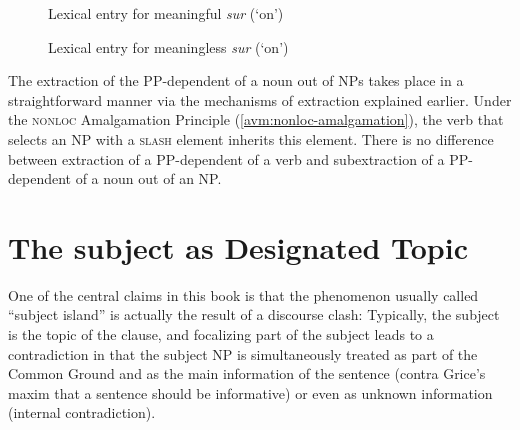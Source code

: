 \begin{figure}
\small\captionsetup{margin=.05\linewidth}%
\begin{floatrow}
\ffigbox
{}
{\caption{Lexical entry for meaningful \emph{sur} (`on')}\label{avm:sur-mf}}
\ffigbox
{}
{\caption{Lexical entry for meaningless \emph{sur} (`on')}\label{avm:sur-ml}}
\end{floatrow}
\end{figure}

The extraction of the PP-dependent of a noun out of NPs takes place in a straightforward manner via the mechanisms of extraction explained earlier. Under the \textsc{nonloc} Amalgamation Principle (\ref{avm:nonloc-amalgamation}), the verb that selects an NP with a \textsc{slash} element inherits this element. There is no difference between extraction of a PP-dependent of a verb and subextraction of a PP-dependent of a noun out of an NP.

\section{The subject as Designated Topic}

One of the central claims in this book is that the phenomenon usually called ``subject island'' is actually the result of a discourse clash: Typically, the subject is the topic of the clause, and focalizing part of the subject leads to a contradiction in that the subject NP is simultaneously treated as part of the Common Ground and as the main information of the sentence (contra Grice's maxim that a sentence should be informative) or even as unknown information (internal contradiction). 

